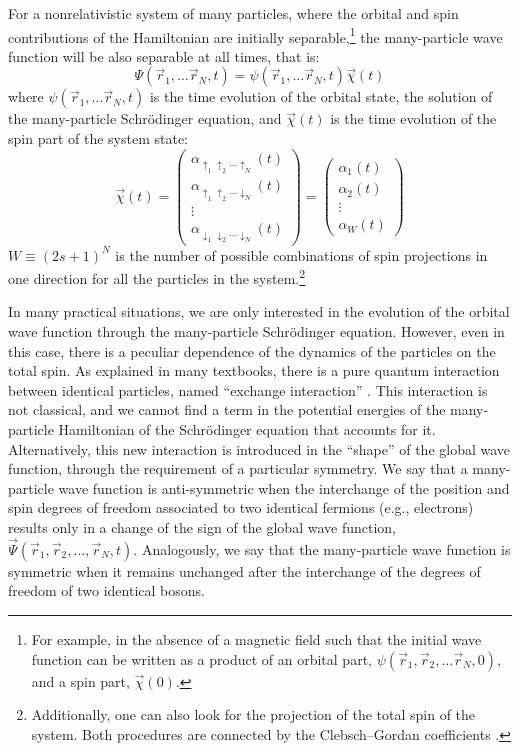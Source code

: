 \documentclass[nofootinbib, secnumarabic, amsmath, nobibnotes,11pt,aps,pra, floatfix]{revtex4-1}
\begin{document}
For a nonrelativistic system of many particles, where the orbital
and spin contributions of the Hamiltonian are initially separable,\footnote{For
example, in the absence of a magnetic field such that  the initial wave
function can be written as a product of an orbital part, $\psi(\vec
r_1,\vec r_2,\ldots\vec r_N,0)$, and a spin part, $\vec \chi(0)$.}
the many-particle wave function will be also separable at all times,
that is:
\begin{equation}
\label{om.spinND}
\Psi(\vec r_1,\ldots\vec r_N,t) = \psi(\vec r_1,\ldots\vec r_N,t) \vec \chi(t)
\end{equation}
where $\psi(\vec r_1,\ldots\vec r_N,t)$ is the time evolution of the orbital state, the solution of the many-particle Schr\"odinger equation, and $\vec \chi(t)$ is the time evolution of the spin part of the system state:
\begin{equation}
\vec \chi(t) = \left(
\begin{array}{c}
\alpha_{\uparrow_1 \uparrow_2\ldots\uparrow_N}(t) \\ \alpha_{\uparrow_1 \uparrow_2\ldots\downarrow_N}(t) \\ \vdots \\ \alpha_{\downarrow_1 \downarrow_2\ldots\downarrow_N}(t)
\end{array}
\right) = \left(
\begin{array}{c}
\alpha_{1}(t) \\ \alpha_{2}(t) \\ \vdots \\ \alpha_{W}(t)
\end{array}
\right)
\end{equation}
$W \equiv (2s + 1)^N$ is the number of possible combinations of spin
projections in one direction for all the particles in the
system.\footnote{Additionally, one can also
look for the projection of the total spin of the system. Both
procedures are connected by the Clebsch--Gordan coefficients
\cite{om.landaulif}.}

In many practical situations, we are only interested in the
evolution of the orbital wave function through the many-particle
Schr\"odinger equation. However, even in this case, there is a
peculiar dependence of the dynamics of the particles on the total
spin. As explained in many textbooks, there is a pure quantum
interaction between identical particles, named ``exchange
interaction'' \cite{om.sakurai94,om.landaulif}. This interaction is
not classical, and we cannot find a term in the potential energies
of the many-particle Hamiltonian of the Schr\"odinger equation that
accounts for it. Alternatively, this new interaction is introduced
in the ``shape'' of the global wave function, through the
requirement of a particular symmetry. We
say that a many-particle wave function is anti-symmetric when the interchange of
the position and spin degrees of freedom associated to two
identical fermions (e.g., electrons) results only in a change of the
sign of the global wave function, $\vec \Psi(\vec r_1,\vec
r_2,\ldots,\vec r_N,t)$. Analogously, we say that the
many-particle wave function is symmetric when it
remains unchanged after the interchange of the degrees of freedom of
two identical  bosons.
\end{document}
